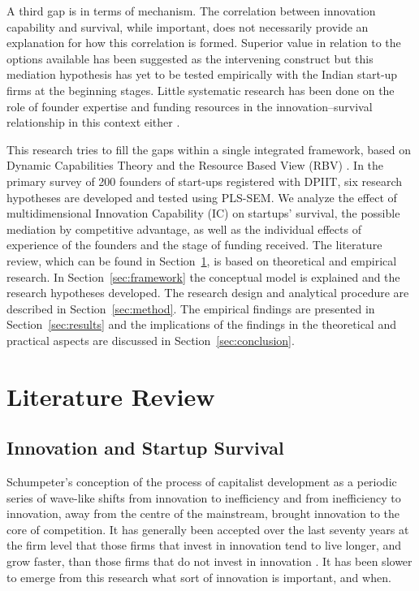 \documentclass{ieeeaccess}
\begin{document}
A third gap is in terms of mechanism. The correlation between innovation capability and survival, while important, does not necessarily provide an explanation for how this correlation is formed. Superior value in relation to the options available has been suggested as the intervening construct \cite{b8} but this mediation hypothesis has yet to be tested empirically with the Indian start-up firms at the beginning stages. Little systematic research has been done on the role of founder expertise and funding resources in the innovation–survival relationship in this context either \cite{b9}.

This research tries to fill the gaps within a single integrated framework, based on Dynamic Capabilities Theory \cite{b10} and the Resource Based View (RBV) \cite{b11}. In the primary survey of 200 founders of start-ups registered with DPIIT, six research hypotheses are developed and tested using PLS-SEM. We analyze the effect of multidimensional Innovation Capability (IC) on startups' survival, the possible mediation by competitive advantage, as well as the individual effects of experience of the founders and the stage of funding received. The literature review, which can be found in Section~\ref{sec:lit}, is based on theoretical and empirical research. In Section~\ref{sec:framework} the conceptual model is explained and the research hypotheses developed. The research design and analytical procedure are described in Section~\ref{sec:method}. The empirical findings are presented in Section~\ref{sec:results} and the implications of the findings in the theoretical and practical aspects are discussed in Section~\ref{sec:conclusion}.

\section{Literature Review}
\label{sec:lit}

\subsection{Innovation and Startup Survival}

Schumpeter's conception \cite{b12} of the process of capitalist development as a periodic series of wave-like shifts from innovation to inefficiency and from inefficiency to innovation, away from the centre of the mainstream, brought innovation to the core of competition. It has generally been accepted over the last seventy years at the firm level that those firms that invest in innovation tend to live longer, and grow faster, than those firms that do not invest in innovation \cite{b4}. It has been slower to emerge from this research what sort of innovation is important, and when.
\end{document}
